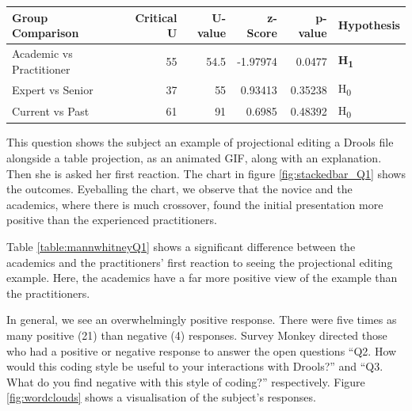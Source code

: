 \noindent\begin{minipage}{\linewidth}
    \centering
    \label{fig:stackedbar_Q1}
    
    \begin{tabular}{ |l ||r |r |r | r|l | } 
        \hline
        Group Comparison                 & Critical U & U-value & z-Score  & p-value & Hypothesis         \\
        \hline
        \hline
        Academic vs Practitioner         & 55         & 54.5    & -1.97974 & 0.0477  & \textbf{H\textsubscript{1}}  \\ 
        \hline
        Expert vs Senior                 & 37         & 55      & 0.93413  & 0.35238 & H\textsubscript{0} \\ 
        \hline
        Current vs Past                  & 61         & 91      & 0.6985   & 0.48392 & H\textsubscript{0} \\ 
        \hline
    \end{tabular}
    \label{table:mannwhitneyQ1}
\end{minipage} 

This question shows the subject an example of projectional editing a Drools file alongside a table projection, as an animated GIF, along with an explanation.
Then she is asked her first reaction. 
The chart in figure \ref{fig:stackedbar_Q1} shows the outcomes.
Eyeballing the chart, we observe that the novice and the academics, where there is much crossover, found the initial presentation more positive than the experienced practitioners.

Table \ref{table:mannwhitneyQ1} shows a significant difference between the academics and the practitioners' first reaction to seeing the projectional editing example.
Here, the academics have a far more positive view of the example than the practitioners.

In general, we see an overwhelmingly positive response.
There were five times as many positive (21) than negative (4) responses.
Survey Monkey directed those who had a positive or negative response to answer the open questions ``Q2. How would this coding style be useful to your interactions with Drools?'' and ``Q3. What do you find negative with this style of coding?'' respectively.
Figure \ref{fig:wordclouds} shows a visualisation of the subject's responses.

